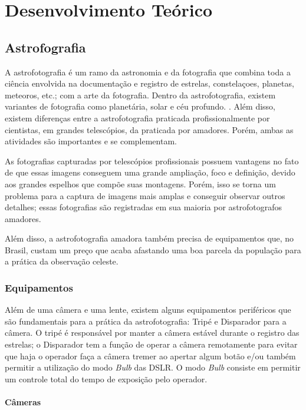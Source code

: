 \chapter{Desenvolvimento Teórico}

\section{Astrofografia}

A astrofotografia é um ramo da astronomia e da fotografia que combina toda a ciência envolvida na documentação e registro de estrelas, constelaçoes, planetas, meteoros, etc.; com a arte da fotografia. Dentro da astrofotografia, existem variantes de fotografia como planetária, solar e céu profundo. \cite{livro:astropratica}. Além disso, existem diferenças entre a astrofotografia praticada profissionalmente por cientistas, em grandes telescópios, da praticada por amadores. Porém, ambas as atividades são importantes e se complementam.

As fotografias capturadas por telescópios profissionais possuem vantagens no fato de que essas imagens conseguem uma grande ampliação, foco e definição, devido aos grandes espelhos que compõe suas montagens. Porém, isso se torna um problema para a captura de imagens mais amplas e conseguir observar outros detalhes; essas fotografias são registradas em sua maioria por astrofotografos amadores. \cite{livro:astropratica}

Além disso, a astrofotografia amadora também precisa de equipamentos que, no Brasil, custam um preço que acaba afastando uma boa parcela da população para a prática da observação celeste. 

\subsection{Equipamentos}

Além de uma câmera e uma lente, existem alguns equipamentos periféricos que são fundamentais para a prática da astrofotografia: Tripé e Disparador para a câmera. O tripé é responsável por manter a câmera estável durante o registro das estrelas; o Disparador tem a função de operar a câmera remotamente para evitar que haja o operador faça a câmera tremer ao apertar algum botão e/ou também permitir a utilização do modo \textit{Bulb} das DSLR. O modo \textit{Bulb} consiste em permitir um controle total do tempo de exposição pelo operador. \cite{book:bbcsky}

\subsubsection{Câmeras}

